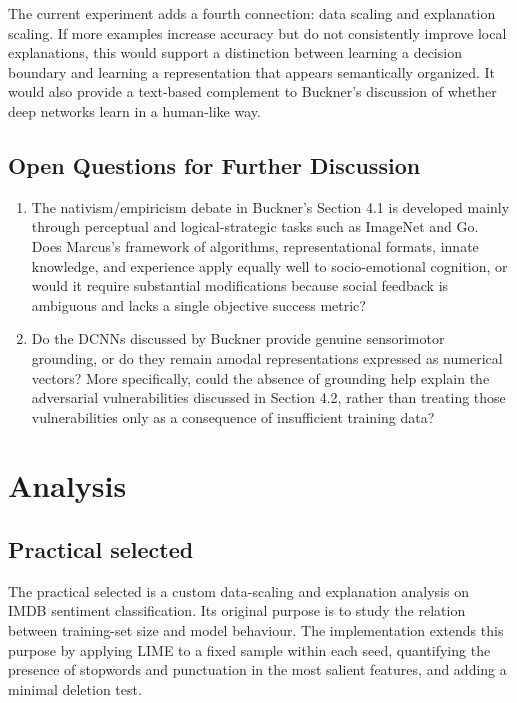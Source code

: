 \documentclass[11pt]{article}
\begin{document}
The current experiment adds a fourth connection: data scaling and explanation scaling. If more examples increase accuracy but do not consistently improve local explanations, this would support a distinction between learning a decision boundary and learning a representation that appears semantically organized. It would also provide a text-based complement to Buckner's discussion of whether deep networks learn in a human-like way.

\subsection{Open Questions for Further Discussion}

\begin{enumerate}[label=(\alph*)]
    \item The nativism/empiricism debate in Buckner's Section 4.1 is developed mainly through perceptual and logical-strategic tasks such as ImageNet and Go. Does Marcus's framework of algorithms, representational formats, innate knowledge, and experience apply equally well to socio-emotional cognition, or would it require substantial modifications because social feedback is ambiguous and lacks a single objective success metric?
    \item Do the DCNNs discussed by Buckner provide genuine sensorimotor grounding, or do they remain amodal representations expressed as numerical vectors? More specifically, could the absence of grounding help explain the adversarial vulnerabilities discussed in Section 4.2, rather than treating those vulnerabilities only as a consequence of insufficient training data?
\end{enumerate}

\newpage

\section{Analysis}
\label{sec:analysis}

\subsection*{Practical selected}

The practical selected is a custom data-scaling and explanation analysis on IMDB sentiment classification. Its original purpose is to study the relation between training-set size and model behaviour. The implementation extends this purpose by applying LIME to a fixed sample within each seed, quantifying the presence of stopwords and punctuation in the most salient features, and adding a minimal deletion test.
\end{document}
